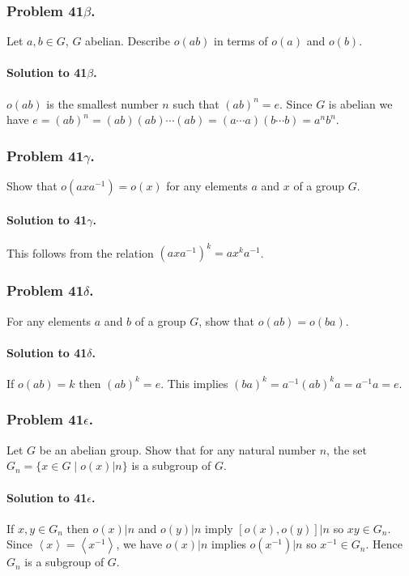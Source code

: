 \subsubsection{Problem 41$\beta$.}
Let $a, b \in G$, $G$ abelian. Describe $o(ab)$ in terms of $o(a)$ and $o(b)$.

\paragraph*{Solution to 41$\beta$.}
$o(ab)$ is the smallest number $n$ such that $(ab)^n=e$. Since $G$ is abelian
we have $e=(ab)^n=(ab)(ab)\cdots(ab)=(a\cdots a)(b\cdots b)=a^n b^n$.

\subsubsection{Problem 41$\gamma$.}
Show that $o(axa^{-1}) = o(x)$ for any elements $a$ and $x$ of a group $G$.

\paragraph*{Solution to 41$\gamma$.}
This follows from the relation $(axa^{-1})^k = ax^k a^{-1}$.

\subsubsection{Problem 41$\delta$.}
For any elements $a$ and $b$ of a group $G$, show that $o(ab) = o(ba)$.

\paragraph*{Solution to 41$\delta$.}
If $o(ab) = k$ then $(ab)^k = e$. This implies $(ba)^k = a^{-1}(ab)^k a = a^{-1}a = e$.

\subsubsection{Problem 41$\epsilon$.}
Let $G$ be an abelian group. Show that for any natural number $n$, the set $G_n
= \{ x \in G \mid o(x) | n \}$ is a subgroup of $G$.

\paragraph*{Solution to 41$\epsilon$.}
If $x, y \in G_n$ then $o(x) | n$ and $o(y) | n$ imply $[o(x), o(y)] | n$ so
$xy \in G_n$. Since $\left<x\right> = \left<x^{-1}\right>$, we have $o(x) | n$ implies $o(x^{-1}) | n$
so $x^{-1} \in G_n$. Hence $G_n$ is a subgroup of $G$.

